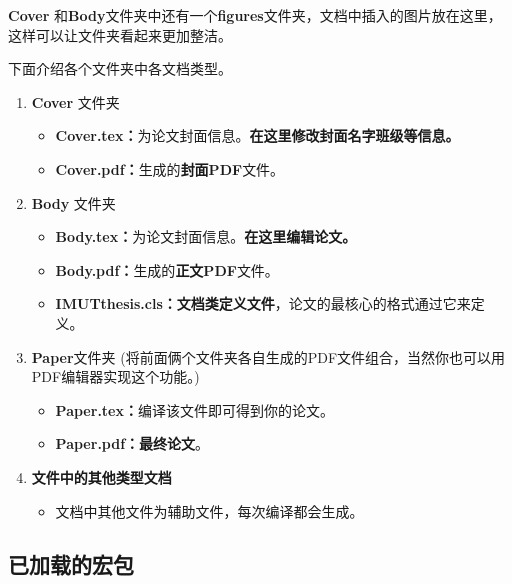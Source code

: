 \documentclass{imutthesis}
\begin{document}
\textbf{Cover} 和\textbf{Body}文件夹中还有一个\textbf{figures}文件夹，文档中插入的图片放在这里，这样可以让文件夹看起来更加整洁。

下面介绍各个文件夹中各文档类型。


\begin{enumerate}
	\item \textbf{Cover} 文件夹
		\begin{itemize}
			\item \textbf{Cover.tex：}为论文封面信息。{\color{red}\textbf{在这里修改封面名字班级等信息。}}
			\item \textbf{Cover.pdf：}生成的{\color{red}\textbf{封面PDF}}文件。	
		\end{itemize}
	\item \textbf{Body} 文件夹
		\begin{itemize}
			\item \textbf{Body.tex：}为论文封面信息。{\color{red}\textbf{在这里编辑论文。}}
			\item \textbf{Body.pdf：}生成的{\color{red}\textbf{正文PDF}}文件。
	    	\item \textbf{IMUTthesis.cls：}{\color{red}\textbf{文档类定义文件}}，论文的最核心的格式通过它来定义。	
    	\end{itemize}
	 \item\textbf{Paper}文件夹  \quad (将前面俩个文件夹各自生成的PDF文件组合，当然你也可以用PDF编辑器实现这个功能。)
		\begin{itemize}
			\item \textbf{Paper.tex：}编译该文件即可得到你的论文。
			\item \textbf{Paper.pdf：}{\color{red}\textbf{最终论文}}。
		\end{itemize}
     \item \textbf{文件中的其他类型文档}
		\begin{itemize}
			\item 文档中其他文件为辅助文件，每次编译都会生成。
	    \end{itemize}
\end{enumerate}
\subsection{已加载的宏包}
\begin{table}[H]
	\centering
	\caption{宏包目录}
\end{table}
\end{document}
